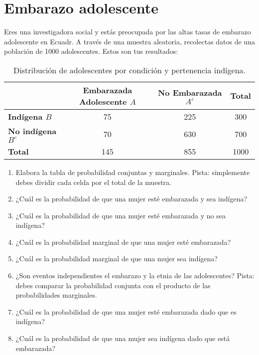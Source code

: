 \documentclass[a4paper]{article}
\begin{document}
\section*{Embarazo adolescente}

Eres una investigadora social y estás preocupada por las altas tasas de embarazo adolescente en Ecuadr. A través de una muestra aleatoria, recolectas datos de una población de 1000 adolescentes. Estos son tus resultados:

\begin{table}[H]
	\centering
	\begin{tabular}{lccc} %
		\toprule
		& \textbf{Embarazada Adolescente $A$} & \textbf{No Embarazada $A^c$} & \textbf{Total} \\
		\midrule
		\textbf{Indígena $B$} & 75 & 225 & 300 \\
		\textbf{No indígena $B^c$} & 70 & 630 & 700 \\
		\midrule
		\textbf{Total} & 145 & 855 & 1000 \\
		\bottomrule
	\end{tabular}
	\caption{Distribución de adolescentes por condición y pertenencia indígena.}
	\label{tabla:distribucion}
\end{table}

\begin{enumerate}[label=\alph*.]
	\item Elabora la tabla de probabilidad conjuntas y marginales. Pista: simplemente debes dividir cada celda por el total de la muestra.
	\item ¿Cuál es la probabilidad de que una mujer esté embarazada y sea indígena?
	\item ¿Cuál es la probabilidad de que una mujer esté embarazada y no sea indígena?
	\item ¿Cuál es la probabilidad marginal de que una mujer esté embarazada?
	\item ¿Cuál es la probabilidad marginal de que una mujer sea indígena?
	\item ¿Son eventos independientes el embarazo y la etnia de las adolescentes? Pista: debes comparar la probabilidad conjunta con el producto de las probabilidades marginales.
	\item ¿Cuál es la probabilidad de que una mujer esté embarazada dado que es indígena?
	\item ¿Cuál es la probabilidad de que una mujer sea indígena dado que está embarazada?
\end{enumerate}
\end{document}
